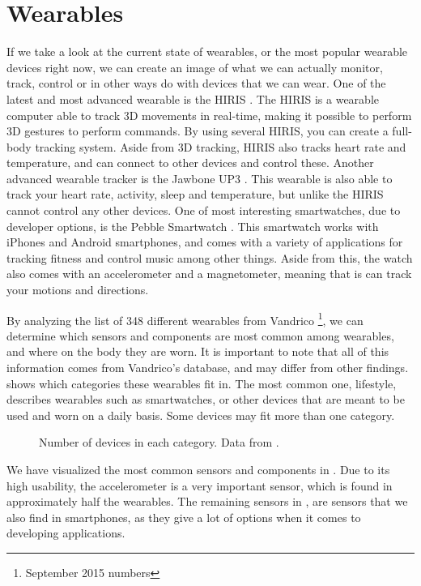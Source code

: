 \section{Wearables}\label{sec:wearables}
If we take a look at the current state of wearables, 
or the most popular wearable devices right now, 
we can create an image of what we can actually monitor, track, 
control or in other ways do with devices that we can wear. 
One of the latest and most advanced wearable is the HIRIS \cite{hirisweb}. 
The HIRIS is a wearable computer able to track 3D movements in real-time, 
making it possible to perform 3D gestures to \eg perform commands. 
By using several HIRIS, you can create a full-body tracking system.
Aside from 3D tracking, HIRIS also tracks heart rate and temperature, 
and can connect to other devices and control these. 
Another advanced wearable tracker is the Jawbone UP3 \cite{JAWBONE}. 
This wearable is also able to track your heart rate, activity, sleep and temperature, 
but unlike the HIRIS cannot control any other devices. 
One of most interesting smartwatches, due to developer options, is the Pebble Smartwatch \cite{PEBBLE}. 
This smartwatch works with iPhones and Android smartphones, 
and comes with a variety of applications for tracking fitness and control music among other things. 
Aside from this, the watch also comes with an accelerometer and a magnetometer, 
meaning that is can track your motions and directions. 

By analyzing the list of 348 different wearables from Vandrico \cite{LISTOFWEARABLES}\footnote{September 2015 numbers}, 
we can determine which sensors and components are most common among wearables, 
and where on the body they are worn. 
It is important to note that all of this information comes from Vandrico's database, 
and may differ from other findings. 
 shows which categories these wearables fit in. 
The most common one, lifestyle, describes wearables such as smartwatches, 
or other devices that are meant to be used and worn on a daily basis. 
Some devices may fit more than one category.

\begin{figure}[!htb]
    \centering
    
    \caption{Number of devices in each category. Data from \protect\cite{LISTOFWEARABLES}.}
    \label{fig:wearables-category}
\end{figure}

We have visualized the most common sensors and components in .
Due to its high usability, the accelerometer is a very important sensor, 
which is found in approximately half the wearables. 
The remaining sensors in , 
are sensors that we also find in smartphones, 
as they give a lot of options when it comes to developing applications. 

